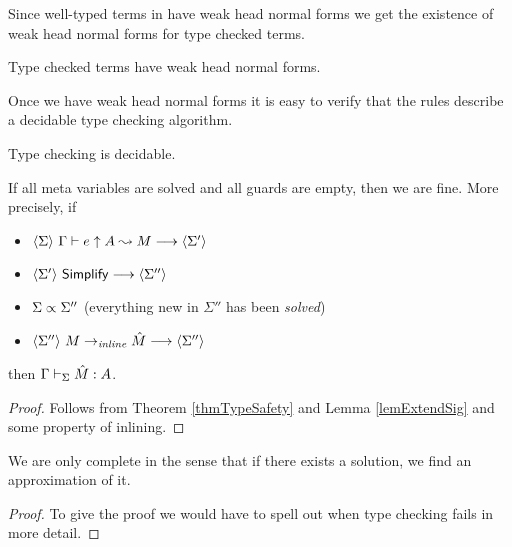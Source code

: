 Since well-typed terms in {\Core} have weak head normal forms we get the
existence of weak head normal forms for type checked terms.

\begin{corollary}
    Type checked terms have weak head normal forms.
\end{corollary}

Once we have weak head normal forms it is easy to verify that the rules
describe a decidable type checking algorithm.

\begin{corollary}
    Type checking is decidable.
\end{corollary}

\begin{theorem}[Soundness]
    If all meta variables are solved and all guards are empty, then we are fine. More precisely, if
    \begin{itemize}
	\item $\langle {\Sigma} \rangle ~{{\Gamma} \vdash {e} \uparrow {A} \leadsto {M}} \longrightarrow \langle {\Sigma'} \rangle$
	\item ${\langle {\Sigma'} \rangle ~{\mathsf{Simplify}} \longrightarrow \langle {\Sigma''} \rangle}$
	\item ${{\Sigma} \propto {\Sigma''}}$ (everything new in $\Sigma''$ has been {\em solved})
	\item ${\langle {\Sigma''} \rangle ~{{M} \to_{\mathit{inline}} {\hat M}} \longrightarrow \langle {\Sigma''} \rangle}$
    \end{itemize}
    then $\Gamma\vdash_{\Sigma}\hat M:A$.
\end{theorem}
\begin{proof}
    Follows from Theorem \ref{thmTypeSafety} and Lemma \ref{lemExtendSig} and
    some property of inlining.
\end{proof}

\begin{theorem}[Completeness]
    We are only complete in the sense that if there exists a solution, we find
    an approximation of it.
\end{theorem}
\begin{proof}
    To give the proof we would have to spell out when type checking fails in
    more detail.
\end{proof}

